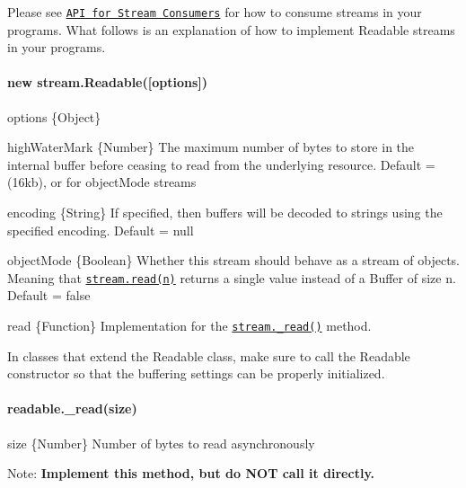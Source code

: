 Please see \href{#stream_api_for_stream_consumers}{\tt A\+PI for Stream Consumers} for how to consume streams in your programs. What follows is an explanation of how to implement Readable streams in your programs.

\paragraph*{new stream.\+Readable(\mbox{[}options\mbox{]})}


\begin{DoxyItemize}
\item {\ttfamily options} \{Object\}
\begin{DoxyItemize}
\item {\ttfamily high\+Water\+Mark} \{Number\} The maximum number of bytes to store in the internal buffer before ceasing to read from the underlying resource. Default = {} (16kb), or {} for {\ttfamily object\+Mode} streams
\item {\ttfamily encoding} \{String\} If specified, then buffers will be decoded to strings using the specified encoding. Default = {\ttfamily null}
\item {\ttfamily object\+Mode} \{Boolean\} Whether this stream should behave as a stream of objects. Meaning that \href{#stream_readable_read_size}{\tt {\ttfamily stream.\+read(n)}} returns a single value instead of a Buffer of size n. Default = {\ttfamily false}
\item {\ttfamily read} \{Function\} Implementation for the \href{#stream_readable_read_size_1}{\tt {\ttfamily stream.\+\_\+read()}} method.
\end{DoxyItemize}
\end{DoxyItemize}

In classes that extend the Readable class, make sure to call the Readable constructor so that the buffering settings can be properly initialized.

\paragraph*{readable.\+\_\+read(size)}


\begin{DoxyItemize}
\item {\ttfamily size} \{Number\} Number of bytes to read asynchronously
\end{DoxyItemize}

Note\+: {\bfseries Implement this method, but do N\+OT call it directly.}


